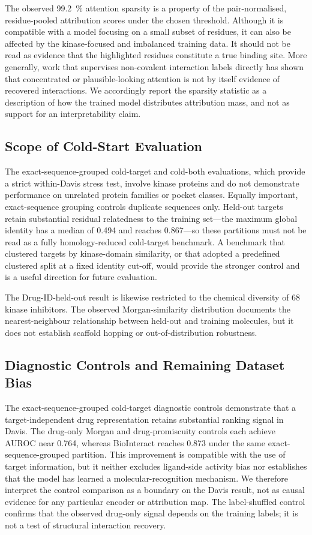 \documentclass[fleqn,10pt]{wlscirep}
\begin{document}
The observed \SI{99.2}{\percent} attention sparsity is a property of the
pair-normalised, residue-pooled attribution scores under the chosen threshold. Although it is
compatible with a model focusing on a small subset of residues, it can also be
affected by the kinase-focused and imbalanced training data.  It should not be
read as evidence that the highlighted residues constitute a true binding site.
More generally, work that supervises non-covalent interaction labels directly
has shown that concentrated or plausible-looking attention is not by itself
evidence of recovered
interactions.\cite{li2020monn,gim2023arkdta,seo2024blendnet}  We accordingly
report the sparsity statistic as a description of how the trained model
distributes attribution mass, and not as support for an interpretability claim.

\subsection{Scope of Cold-Start Evaluation}

The exact-sequence-grouped cold-target and cold-both evaluations, which provide
a strict within-Davis stress test, involve kinase proteins and do not
demonstrate performance on unrelated protein families or pocket classes.
Equally important, exact-sequence grouping controls duplicate sequences only.
Held-out targets retain substantial residual relatedness to the training
set---the maximum global identity has a median of 0.494 and reaches 0.867---so
these partitions must not be read as a fully homology-reduced cold-target
benchmark.  A benchmark that clustered targets by kinase-domain similarity, or
that adopted a predefined clustered split at a fixed identity cut-off, would
provide the stronger control and is a useful direction for future evaluation.

The Drug-ID-held-out result is likewise restricted to the chemical diversity of 68
kinase inhibitors.  The observed Morgan-similarity distribution documents the
nearest-neighbour relationship between held-out and training molecules, but it
does not establish scaffold hopping or out-of-distribution robustness.

\subsection{Diagnostic Controls and Remaining Dataset Bias}

The exact-sequence-grouped cold-target diagnostic controls demonstrate that a target-independent
drug representation retains substantial ranking signal in Davis.  The
drug-only Morgan and drug-promiscuity controls each achieve AUROC near 0.764,
whereas BioInteract reaches 0.873 under the same exact-sequence-grouped
partition.  This improvement is compatible with the use of target information,
but it neither excludes ligand-side activity bias nor establishes that the model
has learned a molecular-recognition mechanism.  We therefore interpret the
control comparison as a boundary on the Davis result, not as causal evidence for
any particular encoder or attribution map.  The label-shuffled control confirms
that the observed drug-only signal depends on the training labels; it is not a
test of structural interaction recovery.
\end{document}

